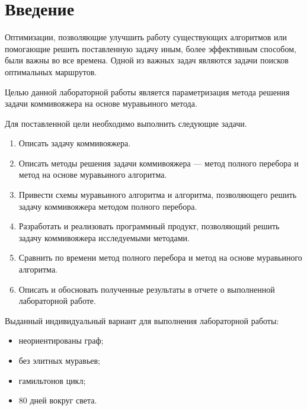 \chapter*{Введение}

Оптимизации, позволяющие улучшить работу существующих алгоритмов
или помогающие решить поставленную задачу иным, более эффективным
способом, были важны во все времена. Одной из важных задач являются
задачи поисков оптимальных маршрутов.

Целью данной лабораторной работы является параметризация метода решения задачи коммивояжера на основе муравьиного метода.

Для поставленной цели необходимо выполнить следующие задачи.
\begin{enumerate}
	\item Описать задачу коммивояжера.
	\item Описать методы решения задачи коммивояжера --- метод полного перебора и метод на основе муравьиного алгоритма.
	\item Привести схемы муравьиного алгоритма и алгоритма, позволяющего решить задачу коммивояжера методом полного перебора.
	\item Разработать и реализовать программный продукт, позволяющий решить задачу коммивояжера исследуемыми методами.
	\item Сравнить по времени метод полного перебора и метод на основе муравьиного алгоритма.
	\item Описать и обосновать полученные результаты в отчете о выполненной лабораторной работе.
\end{enumerate}

Выданный индивидуальный вариант для выполнения лабораторной работы:
\begin{itemize}
	\item неориентированы граф;
	\item без элитных муравьев;
	\item гамильтонов цикл;
	\item 80 дней вокруг света.
\end{itemize}